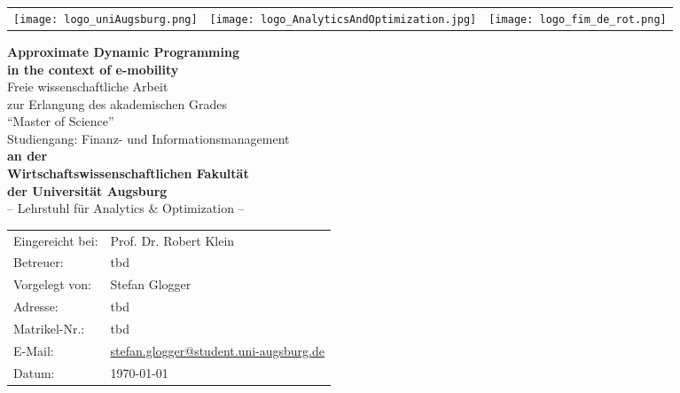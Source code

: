 \begin{titlepage}
\begin{tabularx}{\textwidth}{LYR}
	\texttt{[image: logo\_uniAugsburg.png]} &
	\texttt{[image: logo\_AnalyticsAndOptimization.jpg]} &
	\texttt{[image: logo\_fim\_de\_rot.png]}
\end{tabularx}
\vspace*{1.2cm}
\begin{center}
	{\huge \textbf{Approximate Dynamic Programming\\
	in the context of e-mobility\\}} 
\vspace*{1.2cm}
{\Large Freie wissenschaftliche Arbeit \\
zur Erlangung des akademischen Grades\\
\enquote{Master of Science}\\
Studiengang: Finanz- und Informationsmanagement
} 
\\
\vspace*{1cm}
{\Large \textbf{an der\\
Wirtschaftswissenschaftlichen Fakultät\\
der Universität Augsburg\\
}}
\vspace*{1cm}
{\Large – Lehrstuhl für Analytics \& Optimization –\\}
\vspace*{1cm}
{
\begin{tabular}{ll}
Eingereicht bei:& Prof. Dr. Robert Klein\\
Betreuer:& 			tbd\\
Vorgelegt von:&	Stefan Glogger\\
Adresse:&			tbd\\
Matrikel-Nr.:&		tbd\\
E-Mail:&				\href{mailto:stefan.glogger@student.uni-augsburg.de}{stefan.glogger@student.uni-augsburg.de}\\
Datum:&				\today
\end{tabular}
}
\end{center}
\end{titlepage}
